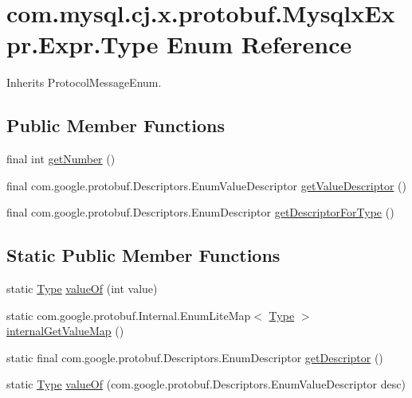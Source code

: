 \hypertarget{enumcom_1_1mysql_1_1cj_1_1x_1_1protobuf_1_1_mysqlx_expr_1_1_expr_1_1_type}{}\section{com.\+mysql.\+cj.\+x.\+protobuf.\+Mysqlx\+Expr.\+Expr.\+Type Enum Reference}
\label{enumcom_1_1mysql_1_1cj_1_1x_1_1protobuf_1_1_mysqlx_expr_1_1_expr_1_1_type}


Inherits Protocol\+Message\+Enum.

\subsection*{Public Member Functions}
\begin{DoxyCompactItemize}
\item 
final int \mbox{\hyperlink{enumcom_1_1mysql_1_1cj_1_1x_1_1protobuf_1_1_mysqlx_expr_1_1_expr_1_1_type_a7bc8dc0159e8a1939fc20832392e9976}{get\+Number}} ()
\item 
final com.\+google.\+protobuf.\+Descriptors.\+Enum\+Value\+Descriptor \mbox{\hyperlink{enumcom_1_1mysql_1_1cj_1_1x_1_1protobuf_1_1_mysqlx_expr_1_1_expr_1_1_type_abaab9b8e3d3de11a7c0256537d9661d1}{get\+Value\+Descriptor}} ()
\item 
final com.\+google.\+protobuf.\+Descriptors.\+Enum\+Descriptor \mbox{\hyperlink{enumcom_1_1mysql_1_1cj_1_1x_1_1protobuf_1_1_mysqlx_expr_1_1_expr_1_1_type_a6198f920054e8b55e74d891f79996bc1}{get\+Descriptor\+For\+Type}} ()
\end{DoxyCompactItemize}
\subsection*{Static Public Member Functions}
\begin{DoxyCompactItemize}
\item 
static \mbox{\hyperlink{enumcom_1_1mysql_1_1cj_1_1x_1_1protobuf_1_1_mysqlx_expr_1_1_expr_1_1_type}{Type}} \mbox{\hyperlink{enumcom_1_1mysql_1_1cj_1_1x_1_1protobuf_1_1_mysqlx_expr_1_1_expr_1_1_type_a5a5272a3070bf3d48c44737d2f8ea6f2}{value\+Of}} (int value)
\item 
static com.\+google.\+protobuf.\+Internal.\+Enum\+Lite\+Map$<$ \mbox{\hyperlink{enumcom_1_1mysql_1_1cj_1_1x_1_1protobuf_1_1_mysqlx_expr_1_1_expr_1_1_type}{Type}} $>$ \mbox{\hyperlink{enumcom_1_1mysql_1_1cj_1_1x_1_1protobuf_1_1_mysqlx_expr_1_1_expr_1_1_type_aa843eb9294bb78c33c53857ba442be5c}{internal\+Get\+Value\+Map}} ()
\item 
static final com.\+google.\+protobuf.\+Descriptors.\+Enum\+Descriptor \mbox{\hyperlink{enumcom_1_1mysql_1_1cj_1_1x_1_1protobuf_1_1_mysqlx_expr_1_1_expr_1_1_type_a626f29a0275ca8a67e861df96796c88d}{get\+Descriptor}} ()
\item 
static \mbox{\hyperlink{enumcom_1_1mysql_1_1cj_1_1x_1_1protobuf_1_1_mysqlx_expr_1_1_expr_1_1_type}{Type}} \mbox{\hyperlink{enumcom_1_1mysql_1_1cj_1_1x_1_1protobuf_1_1_mysqlx_expr_1_1_expr_1_1_type_a69c8b4c68a0ab49a8b0012667f5ccd75}{value\+Of}} (com.\+google.\+protobuf.\+Descriptors.\+Enum\+Value\+Descriptor desc)
\end{DoxyCompactItemize}
